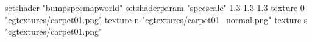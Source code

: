 setshader "bumpspecmapworld"
setshaderparam "specscale" 1.3 1.3 1.3
    texture 0 "cgtextures/carpet01.png"
    texture n "cgtextures/carpet01_normal.png"
    texture s "cgtextures/carpet01.png"